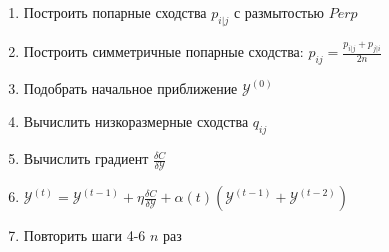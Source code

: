 \begin{enumerate}
	\item Построить попарные сходства $p_{i|j}$ с размытостью $Perp$
	\item Построить симметричные попарные сходства: $p_{ij} = \frac{p_{i|j} + p_{j|i}}{2n}$
	\item Подобрать начальное приближение $\mathcal{Y}^{(0)}$
	\item Вычислить низкоразмерные сходства $q_{ij}$
	\item Вычислить градиент $\frac{\delta C}{\delta \mathcal{Y}}$
	\item $\mathcal{Y}^{(t)} = \mathcal{Y}^{(t - 1)} + \eta \frac{\delta C}{\delta \mathcal{Y}} + \alpha(t) (\mathcal{Y}^{(t -1)} + \mathcal{Y}^{(t-2)})$
	\item Повторить шаги 4-6 $n$ раз
\end{enumerate}
